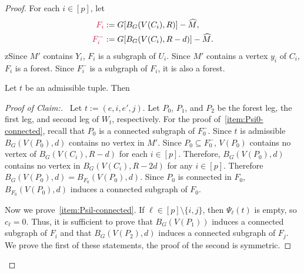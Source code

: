 \documentclass{patmorin}
\newcommand{\pat}[1]{\textcolor{Blue}{Pat: #1}}
\newcommand{\piotr}[1]{\textcolor{red}{Piotr: #1}}
\newenvironment{clmproof}{\begin{proof}[Proof of Claim:]\renewcommand{\qedsymbol}{\rule{1ex}{1ex}}}{\end{proof}}
\DeclarePairedDelimiter\set{\{}{\}}
\begin{document}
\begin{proof}
For each $i\in[p]$, let 
\begin{align*}
\mathdefin{F_i}&:=G[B_G(V(C_i),R)]-\widehat{M},\\
\mathdefin{F_i^-}&:=G[B_G(V(C_i),R-d)]-\widehat{M}. 
\end{align*}
zSince $M'$ contains $Y_i$, $F_i$ is a subgraph of $U_i$.  Since $M'$ contains a vertex $y_i$ of $C_i$, $F_i$ is a forest.  Since $F^-_i$ is a subgraph of $F_i$, it is also a forest.

\begin{clm}\label{clm:three-components}
Let $t$ be an admissible tuple. Then
\end{clm}

\begin{clmproof}\
    Let $t:=(e,i,e',j)$. 
    Let $P_0$, $P_1$, and $P_2$ be the forest leg, the first leg, and second leg of $W_t$, respectively.   For the proof of~\cref{item:Psi0-connected}, recall that $P_0$ is a connected subgraph of $F_0^-$. Since $t$ is admissible $B_G(V(P_0),d)$ contains no vertex in $M'$. Since $P_0\subseteq F_0^-$, $V(P_0)$ contains no vertex of $B_G(V(C_i),R-d)$ for each $i\in[p]$. Therefore, $B_G(V(P_0),d)$ contains no vertex in $B_G(V(C_i),R-2d)$ for any $i\in[p]$. Therefore $B_G(V(P_0),d)=B_{F_0}(V(P_0),d)$.
    Since $P_0$ is connected in $F_0$, 
    $B_{F_0}(V(P_0),d)$ induces a connected subgraph of $F_0$. 
    
    Now we prove~\cref{item:Psil-connected}. If $\ell\in [p]\setminus\{i,j\}$, then $\Psi_\ell(t)$ is empty, so $c_\ell=0$.
    Thus, it is sufficient to prove that $B_G(V(P_1))$ induces a connected subgraph of $F_i$ and that $B_G(V(P_2),d)$ induces a connected subgraph of $F_j$.  We prove the first of these statements, the proof of the second is symmetric.
    

\end{clmproof}
\end{proof}
\end{document}
